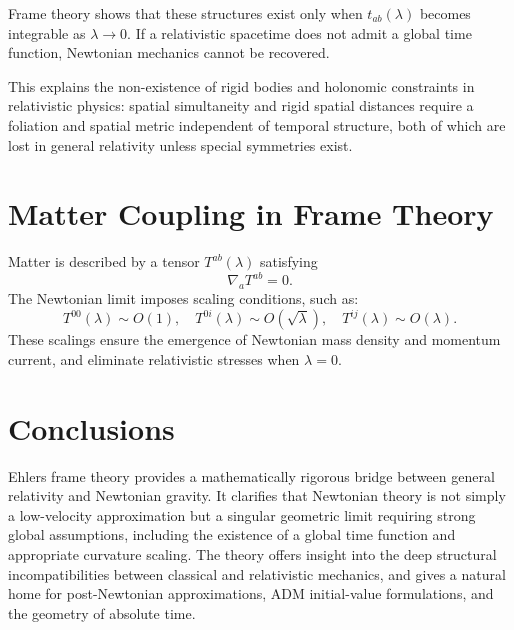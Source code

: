 \documentclass[12pt]{article}
\begin{document}
Frame theory shows that these structures exist only when
$t_{ab}(\lambda)$ becomes integrable as $\lambda\to0$.
If a relativistic spacetime does not admit a global time function,
Newtonian mechanics cannot be recovered.

This explains the non-existence of rigid bodies and holonomic constraints in
relativistic physics: spatial simultaneity and rigid spatial distances require
a foliation and spatial metric independent of temporal structure, both of which
are lost in general relativity unless special symmetries exist.

\section{Matter Coupling in Frame Theory}

Matter is described by a tensor $T^{ab}(\lambda)$ satisfying
\[
\nabla_a T^{ab} = 0.
\]
The Newtonian limit imposes scaling conditions, such as:
\[
T^{00}(\lambda) \sim O(1), \quad 
T^{0i}(\lambda) \sim O(\sqrt{\lambda}), \quad
T^{ij}(\lambda) \sim O(\lambda).
\]
These scalings ensure the emergence of Newtonian mass density and momentum
current, and eliminate relativistic stresses when $\lambda=0$.

\section{Conclusions}

Ehlers frame theory provides a mathematically rigorous bridge between general
relativity and Newtonian gravity.
It clarifies that Newtonian theory is not simply a low-velocity approximation
but a singular geometric limit requiring strong global assumptions, including
the existence of a global time function and appropriate curvature scaling.
The theory offers insight into the deep structural incompatibilities between
classical and relativistic mechanics, and gives a natural home for
post-Newtonian approximations, ADM initial-value formulations, and the geometry
of absolute time.
\end{document}
